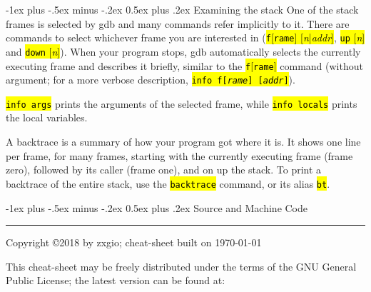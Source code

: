 \documentclass[a4paper,landscape]{article}
\makeatletter
\renewcommand{\section}{\@startsection{section}{1}{0mm}%
                                {-1ex plus -.5ex minus -.2ex}%
                                {0.5ex plus .2ex}%
                                {\normalfont\large\bfseries}}
\makeatother
\begin{document}
\begin{multicols*}{3}
\section{Examining the stack}
One of the stack frames is selected by gdb and many commands refer implicitly to it.
There are commands to select whichever frame you are interested in (\hl{\texttt{f}[\texttt{rame}] [\textit{n}|\textit{addr}]}, \hl{\texttt{up} [\textit{n}]} and \hl{\texttt{down} [\textit{n}]}).
When your program stops, gdb automatically selects the currently executing frame and
describes it briefly, similar to the \hl{\texttt{f}[\texttt{rame}]} command (without argument;
for a more verbose description, \hl{\texttt{info f[\textit{rame}] [\textit{addr}]}}).

\hl{\texttt{info args}} prints the arguments of the selected frame, while \hl{\texttt{info locals}}
prints the local variables.

A backtrace is a summary of how your program got where it is. It shows one line per frame,
for many frames, starting with the currently executing frame (frame zero), followed by its
caller (frame one), and on up the stack.
To print a backtrace of the entire stack, use the \hl{\texttt{backtrace}} command, or its alias \hl{\texttt{bt}}.

\section{Source and Machine Code}

\rule{1.0\linewidth}{0.25pt}
\scriptsize
Copyright \copyright 2018 by zxgio; cheat-sheet built on \today

This cheat-sheet may be freely distributed under the terms of the GNU
General Public License; the latest version can be found at: \\
\end{multicols*}
\end{document}
